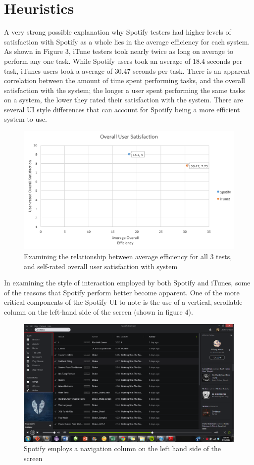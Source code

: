 \documentclass[12pt]{report}
\begin{document}
\section{Heuristics}

A very strong possible explanation why Spotify testers had higher levels of satisfaction with Spotify as a whole lies in the average efficiency for each system. As shown in Figure 3, iTune testers took nearly twice as long on average to perform any one task. While Spotify users took an average of 18.4 seconds per task, iTunes users took a average of 30.47 seconds per task. There is an apparent correlation between the amount of time spent performing tasks, and the overall satisfaction with the system; the longer a user spent performing the same tasks on a system, the lower they rated their satisfaction with the system. There are several UI style differences that can account for Spotify being a more efficient system to use.

\begin{figure}[H]
	\centering
	\includegraphics[width=.75\textwidth]{chart3.png}
	\caption{Examining the relationship between average efficiency for all 3 tests, and self-rated overall user satisfaction with system}
\end{figure}

In examining the style of interaction employed by both Spotify and iTunes, some of the reasons that Spotify perform better become apparent. One of the more critical components of the Spotify UI to note is the use of a vertical, scrollable column on the left-hand side of the screen (shown in figure 4). 

\begin{figure}[H]
	\centering
	\includegraphics[width=\textwidth]{chart4.png}
	\caption{Spotify employs a navigation column on the left hand side of the screen}
\end{figure}
\end{document}
